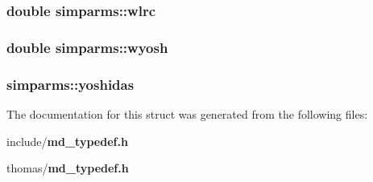 \subsubsection{\setlength{\rightskip}{0pt plus 5cm}double {\bf simparms::wlrc}}\label{structsimparms_5cd5decff02cbcc4982853fe3f607765}


\subsubsection{\setlength{\rightskip}{0pt plus 5cm}double {\bf simparms::wyosh}}\label{structsimparms_d4cc1dd1821fe34e6a09cdee00f1ce40}


\subsubsection{ {\bf simparms::yoshidas}}\label{structsimparms_d7370db137974b0aa6d9c25c4225075d}




The documentation for this struct was generated from the following files:\begin{CompactItemize}
\item 
include/{\bf md\_\-typedef.h}\item 
thomas/{\bf md\_\-typedef.h}\end{CompactItemize}
